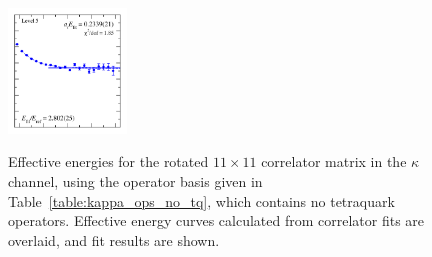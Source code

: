 \begin{figure}
  \includegraphics[width=0.28\textwidth]{figures/spectrum_a1g/no_tq/fits/fit_5.pdf}\\
  \caption{Effective energies for the rotated $11\times 11$ correlator matrix in the $\kappa$ channel, using the operator basis given in Table~\ref{table:kappa_ops_no_tq}, which contains no tetraquark operators. Effective energy curves calculated from correlator fits are overlaid, and fit results are shown.}
  \label{fig:kappa_no_tq_grid}
\end{figure}

